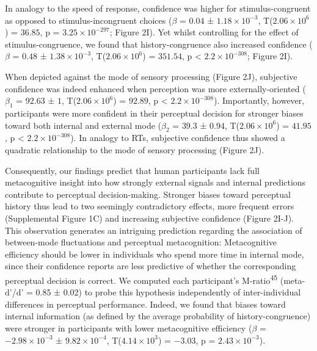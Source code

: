 \documentclass[
]{article}
\begin{document}
In analogy to the speed of response, confidence was higher for
stimulus-congruent as opposed to stimulus-incongruent choices (\(\beta\)
= \(0.04\) ± \(\ensuremath{1.18\times 10^{-3}}\),
T(\(\ensuremath{2.06\times 10^{6}}\)) = \(36.85\), p =
\(\ensuremath{3.25\times 10^{-297}}\); Figure 2I). Yet whilst
controlling for the effect of stimulus-congruence, we found that
history-congruence also increased confidence (\(\beta\) = \(0.48\) ±
\(\ensuremath{1.38\times 10^{-3}}\),
T(\(\ensuremath{2.06\times 10^{6}}\)) = \(351.54\), p < \(\ensuremath{2.2\times 10^{-308}}\); Figure
2I).

When depicted against the mode of sensory processing (Figure 2J),
subjective confidence was indeed enhanced when perception was more
externally-oriented (\(\beta_1\) = \(92.63\) ± \(1\),
T(\(\ensuremath{2.06\times 10^{6}}\)) = \(92.89\), p < \(\ensuremath{2.2\times 10^{-308}}\)).
Importantly, however, participants were more confident in their
perceptual decision for stronger biases toward both internal and
external mode (\(\beta_2\) = \(39.3\) ± \(0.94\),
T(\(\ensuremath{2.06\times 10^{6}}\)) = \(41.95\), p < \(\ensuremath{2.2\times 10^{-308}}\)). In
analogy to RTs, subjective confidence thus showed a quadratic
relationship to the mode of sensory processing (Figure 2J).

Consequently, our findings predict that human participants lack full
metacognitive insight into how strongly external signals and internal
predictions contribute to perceptual decision-making. Stronger biases
toward perceptual history thus lead to two seemingly contradictory
effects, more frequent errors (Supplemental Figure 1C) and increasing
subjective confidence (Figure 2I-J). This observation generates an
intriguing prediction regarding the association of between-mode
fluctuations and perceptual metacognition: Metacognitive efficiency
should be lower in individuals who spend more time in internal mode,
since their confidence reports are less predictive of whether the
corresponding perceptual decision is correct. We computed each
participant's M-ratio\textsuperscript{45} (meta-d'/d' = 0.85 ± 0.02) to
probe this hypothesis independently of inter-individual differences in
perceptual performance. Indeed, we found that biases toward internal
information (as defined by the average probability of
history-congruence) were stronger in participants with lower
metacognitive efficiency (\(\beta\) =
\(\ensuremath{-2.98\times 10^{-3}}\) ±
\(\ensuremath{9.82\times 10^{-4}}\),
T(\(\ensuremath{4.14\times 10^{3}}\)) = \(-3.03\), p =
\(\ensuremath{2.43\times 10^{-3}}\)).
\end{document}
